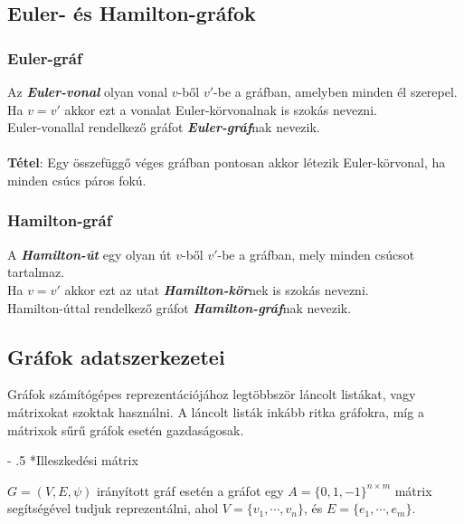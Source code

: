 \documentclass[12pt,margin=0px]{article}
\makeatletter
\renewcommand\paragraph{%
	\@startsection{paragraph}{4}{0mm}%
	{-\baselineskip}%
	{.5\baselineskip}%
	{\normalfont\normalsize\bfseries}}
\makeatother
\begin{document}
	\subsection*{Euler- és Hamilton-gráfok\\}

	\subsubsection*{Euler-gráf\\}
    Az \emph{\textbf{Euler-vonal}} olyan vonal $v$-ből $v'$-be a gráfban, amelyben minden él szerepel.\\
    Ha $v=v'$ akkor ezt a vonalat Euler-körvonalnak  is szokás nevezni. \\
    Euler-vonallal rendelkező gráfot \emph{\textbf{Euler-gráf}}nak nevezik.\\\\
    \textbf{Tétel}: Egy összefüggő véges gráfban pontosan akkor létezik Euler-körvonal, ha minden csúcs páros fokú.

	\subsubsection*{Hamilton-gráf\\}

    A \emph{\textbf{Hamilton-út}} egy olyan út $v$-ből $v'$-be a gráfban, mely minden csúcsot tartalmaz. \\
    Ha $v=v'$ akkor ezt az utat \emph{\textbf{Hamilton-kör}}nek is szokás nevezni. \\
    Hamilton-úttal rendelkező gráfot \emph{\textbf{Hamilton-gráf}}nak nevezik.

	\subsection*{Gráfok adatszerkezetei\\}

    Gráfok számítógépes reprezentációjához legtöbbször láncolt listákat, vagy mátrixokat szoktak használni. A láncolt listák inkább ritka gráfokra, míg a mátrixok sűrű gráfok esetén gazdaságosak.
			
    \paragraph*{Illeszkedési mátrix\\}

    $G = (V,E, \psi)$ irányított gráf esetén a gráfot egy $A = \{0,1,-1\}^{n\times m}$ mátrix segítségével tudjuk reprezentálni, ahol $V = \{v_1,\cdots, v_n\}$, és $E = \{e_1,\cdots,e_m\}$. \\
\end{document}
